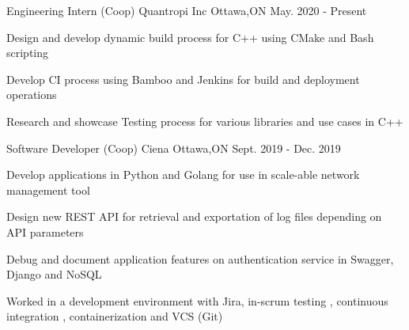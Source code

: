 

\begin{cventries}
  \cventry
    {Engineering Intern (Coop)} %
    {Quantropi Inc } %
    {Ottawa,ON} %
    {May. 2020 - Present} %
    {
      \begin{cvitems} %
      \item { Design and develop dynamic build process for C\C++ using CMake and Bash scripting }
      \item { Develop CI process using Bamboo and Jenkins for build and deployment operations }
      \item { Research and showcase Testing process for various libraries and use cases in C++ }
      \end{cvitems}
    }
  \cventry
    {Software Developer (Coop)} %
    {Ciena} %
    {Ottawa,ON} %
    {Sept. 2019 - Dec. 2019} %
    {
      \begin{cvitems} %
      \item { Develop applications in Python and Golang for use in scale-able network management tool}
      \item { Design new REST API for retrieval and exportation of log files depending on API parameters}
      \item { Debug and document application features on authentication service in Swagger, Django and NoSQL }
      \item { Worked in a development environment with Jira,  in-scrum testing , continuous integration , containerization and VCS (Git)  } 
      \end{cvitems}
    }




\end{cventries}
